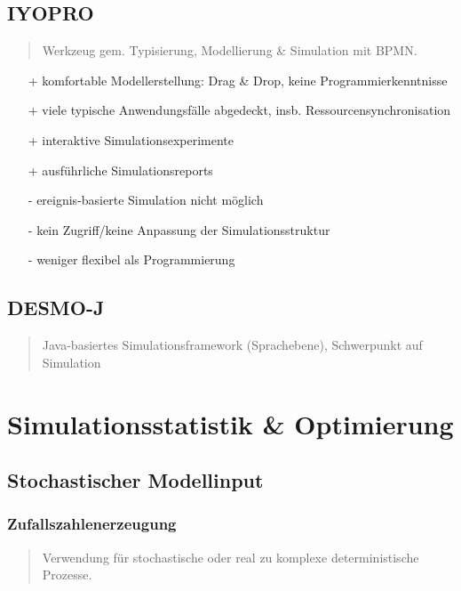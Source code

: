 \documentclass{article}
\begin{document}
\subsection{IYOPRO}
\begin{quote}Werkzeug gem. Typisierung, Modellierung \& Simulation mit BPMN.\end{quote}
\begin{itemize}
  \item[+] komfortable Modellerstellung: Drag \& Drop, keine Programmierkenntnisse
  \item[+] viele typische Anwendungsfälle abgedeckt, insb. Ressourcensynchronisation
  \item[+] interaktive Simulationsexperimente
  \item[+] ausführliche Simulationsreports
  \item[-] ereignis-basierte Simulation nicht möglich
  \item[-] kein Zugriff/keine Anpassung der Simulationsstruktur
  \item[-] weniger flexibel als Programmierung
\end{itemize}

\subsection{DESMO-J}
\begin{quote}Java-basiertes Simulationsframework (Sprachebene), Schwerpunkt auf Simulation\end{quote}

\section{Simulationsstatistik \& Optimierung}
\subsection{Stochastischer Modellinput}
\subsubsection{Zufallszahlenerzeugung}
\begin{quote}Verwendung für stochastische oder real zu komplexe deterministische Prozesse.\end{quote}
\end{document}
